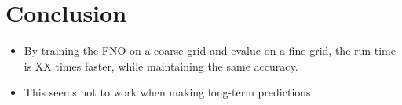 \chapter{Conclusion}\label{ch:conclusion}


\begin{itemize}
    \item By training the FNO on a coarse grid and evalue on a fine grid, the run time is XX times faster, while maintaining the same accuracy.
    \item This seems not to work when making long-term predictions.
\end{itemize}



